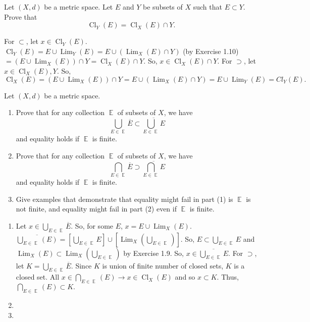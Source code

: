 \documentclass[12pt,letterpaper,boxed]{hmcpset}
\DeclareMathOperator{\Lim}{Lim}
\DeclareMathOperator{\Cl}{Cl}
\DeclareMathOperator{\bigep}{\mathbb{E}}
\begin{document}

\begin{problem}[Exercise 1.25]
Let $(X, d)$ be a metric space. Let $E$ and $Y$ be subsets of $X$ such that $E\subset Y.$ Prove that $$\Cl_Y(E)=\Cl_X(E)\cap Y.$$
\end{problem}

\begin{solution}
For $\subset$, let $x\in \Cl_Y(E)$. $\Cl_Y(E)= E \cup \Lim_Y(E)= E \cup (\Lim_X(E)\cap Y)$ (by Exercise 1.10) $ = (E \cup \Lim_X(E))\cap Y = \Cl_X(E)\cap Y.$ So, $x \in \Cl_X(E)\cap Y.$ For $\supset$, let $x\in\Cl_X(E), Y$. So, $\Cl_X(E) = (E \cup \Lim_X(E))\cap Y = E \cup (\Lim_X(E)\cap Y) = E \cup \Lim_Y(E) = Cl_Y(E).$
\end{solution}

\begin{problem}[Exercise 1.26]
Let $(X, d)$ be a metric space.
	\vspace{-2mm}
	\begin{enumerate}
		\itemsep0em
		\item Prove that for any collection $\bigep$ of subsets of $X$, we have $$ \bigcup_{E\in\bigep} \overline{E} \subset \overline{\bigcup_{E\in\bigep} E}$$ and equality holds if $\bigep$ is finite.
		\item Prove that for any collection $\bigep$ of subsets of $X$, we have $$ \bigcap_{E\in\bigep} \overline{E} \supset \overline{\bigcap_{E\in\bigep} E}$$ and equality holds if $\bigep$ is finite.
		\item Give examples that demonstrate that equality might fail in part (1) is $\bigep$ is not finite, and equality might fail in part (2) even if $\bigep$ is finite.
	\end{enumerate}
\end{problem}

\begin{solution}
\vspace{-2mm}
	\begin{enumerate}
		\itemsep0em
		\item Let $x \in \bigcup_{E \in \bigep} \overline{E}.$ So, for some $E$, $x = E \cup \Lim_X(E).$ $\overline{\bigcup_{E\in\bigep}(E)} = [\bigcup_{E \in \bigep}E]\cup[\Lim_X(\bigcup_{E \in \bigep})].$ So, $E \subset \bigcup_{E \in \bigep}E$ and $\Lim_X (E) \subset \Lim_X(\bigcup_{E \in \bigep})$ by Exercise 1.9. So, $x \in \overline{\bigcup_{E\in\bigep} E}.$ For $\supset$, let $K = \bigcup_{E\in\bigep} \overline{E}.$ Since $K$ is union of finite number of closed sets, $K$ is a closed set. All $x\in \bigcap_{E \in \bigep}(E) \rightarrow x \in \Cl_X(E)$ and so $x \subset K.$ Thus, $\bigcap_{E \in \bigep}(E) \subset K.$ 
		\item 
		\item 
	\end{enumerate}
\end{solution}
\end{document}
